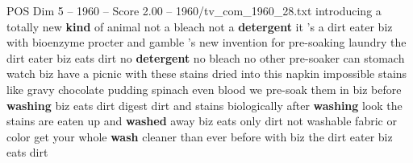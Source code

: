 \begin{textsample}{POS Dim 5 – 1960 – Score 2.00 – 1960/tv\_com\_1960\_28.txt}  \label{ex:f5_pos_086}
introducing a totally new \textbf{kind} of animal not a bleach not a \textbf{detergent} it 's a dirt eater biz with bioenzyme procter and gamble 's new invention for pre-soaking laundry the dirt eater biz eats dirt no \textbf{detergent} no bleach no other pre-soaker can stomach watch biz have a picnic with these stains dried into this napkin impossible stains like gravy chocolate pudding spinach even blood we pre-soak them in biz before \textbf{washing} biz eats dirt digest dirt and stains biologically after \textbf{washing} look the stains are eaten up and \textbf{washed} away biz eats only dirt not washable fabric or color get your whole \textbf{wash} cleaner than ever before with biz the dirt eater biz eats dirt

\end{textsample}
